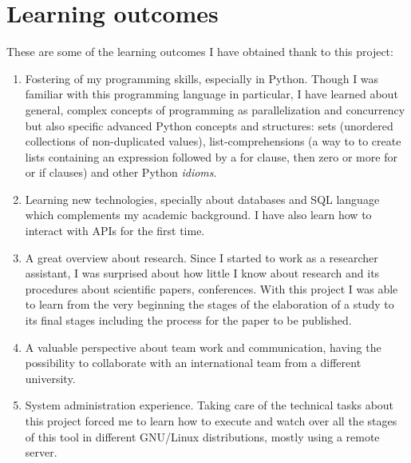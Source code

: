 \documentclass[a4paper, 12pt]{book}
\begin{document}
\section{Learning outcomes}
\label{sec:learning-outcomes}
These are some of the learning outcomes I have obtained thank to this project:
\begin{enumerate}
  \item Fostering of my programming skills, especially in Python. Though I was familiar with
  this programming language in particular, I have learned about general, complex concepts of programming
  as parallelization and concurrency but also specific advanced Python concepts and structures:
  sets (unordered collections of non-duplicated values), list-comprehensions
  (a way to to create lists containing an expression followed by a for clause, then
  zero or more for or if clauses) and other Python \textit{idioms}.
  \item Learning new technologies, specially about databases and SQL language which
  complements my academic background. I have also learn how to interact with APIs for the first time.
  \item A great overview about research. Since I started to work as a researcher assistant,
  I was surprised about how little I know about research and its procedures about scientific papers,
  conferences. With this project I was able to learn from the very beginning the stages of the elaboration
  of a study to its final stages including the process for the paper to be published.
  \item A valuable perspective about team work and communication, having the possibility
  to collaborate with an international team from a different university.
  \item System administration experience. Taking care of the technical tasks about this project forced me
  to learn how to execute and watch over all the stages of this tool in different GNU/Linux distributions,
  mostly using a remote server.
\end{enumerate}
\end{document}
